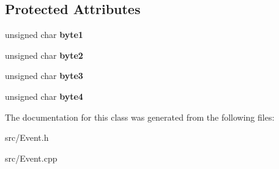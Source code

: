\subsection*{Protected Attributes}
\begin{DoxyCompactItemize}
\item 
\hypertarget{class_event_a0d03df6eea9f118a11f218f608f9b793}{}unsigned char {\bfseries byte1}\label{class_event_a0d03df6eea9f118a11f218f608f9b793}

\item 
\hypertarget{class_event_aea800ab88f8c9257a4f640b8b80b5d88}{}unsigned char {\bfseries byte2}\label{class_event_aea800ab88f8c9257a4f640b8b80b5d88}

\item 
\hypertarget{class_event_a620aa4a34714b9d2a50e9181daceeb6f}{}unsigned char {\bfseries byte3}\label{class_event_a620aa4a34714b9d2a50e9181daceeb6f}

\item 
\hypertarget{class_event_a70d1340a405cdf5e2f77fc256630cb29}{}unsigned char {\bfseries byte4}\label{class_event_a70d1340a405cdf5e2f77fc256630cb29}

\end{DoxyCompactItemize}


The documentation for this class was generated from the following files\+:\begin{DoxyCompactItemize}
\item 
src/Event.\+h\item 
src/Event.\+cpp\end{DoxyCompactItemize}

